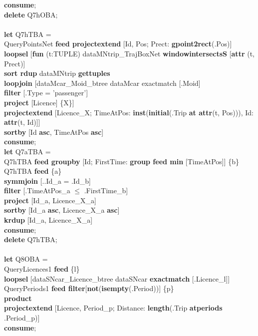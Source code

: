 \documentclass[a4paper]{article}
\newcommand{\op}[1]{\textbf{#1}}
\begin{document}
\begin{scriptsize}
\begin{tabbing}
\op{consume};\\
\op{delete} Q7hOBA;\\
\\
\op{let} Q7hTBA =\\
\>QueryPointsNet \op{feed projectextend} [Id, Pos; Prect: \op{gpoint2rect}(.Pos)]\\
\>\op{loopsel} [\op{fun} (t:TUPLE) dataMNtrip\_TrajBoxNet \op{windowintersectsS} [\op{attr} (t, Prect)]\\
\>\>\op{sort rdup} dataMNtrip \op{gettuples}\\
\>\>\op{loopjoin} [dataMcar\_Moid\_btree dataMcar exactmatch [.Moid]\\
\>\>\>\op{filter} [.Type = 'passenger']\\
\>\>\>\op{project} [Licence] \{X\}]\\
\>\>\op{projectextend} [Licence\_X; TimeAtPos: \op{inst}(\op{initial}(.Trip \op{at attr}(t, Pos))), Id: \op{attr}(t, Id)]]\\
\>\op{sortby} [Id \op{asc}, TimeAtPos \op{asc}]\\
\op{consume};\\
\op{let} Q7aTBA =\\
\>Q7hTBA \op{feed groupby} [Id; FirstTime: \op{group feed min} [TimeAtPos]] \{b\}\\
\>Q7hTBA \op{feed} \{a\}\\
\>\op{symmjoin} [..Id\_a = .Id\_b]\\
\>\op{filter} [.TimeAtPos\_a $\leq$ .FirstTime\_b]\\
\>\op{project} [Id\_a, Licence\_X\_a]\\
\>\op{sortby} [Id\_a \op{asc}, Licence\_X\_a \op{asc}]\\
\>\op{krdup} [Id\_a, Licence\_X\_a]\\
\op{consume};\\
\op{delete} Q7hTBA;\\
\\
\op{let} Q8OBA =\\
\>QueryLicences1 \op{feed} \{l\}\\
\>\>\op{loopsel} [dataSNcar\_Licence\_btree dataSNcar \op{exactmatch}
[.Licence\_l]]\\
\>QueryPeriods1 \op{feed filter}[\op{not}(\op{isempty}(.Period))] \{p\}\\
\>\op{product}\\
\>\op{projectextend} [Licence, Period\_p; Distance: \op{length}(.Trip
\op{atperiods} .Period\_p)]\\
\op{consume};\\

\end{tabbing}
\end{scriptsize}
\end{document}
